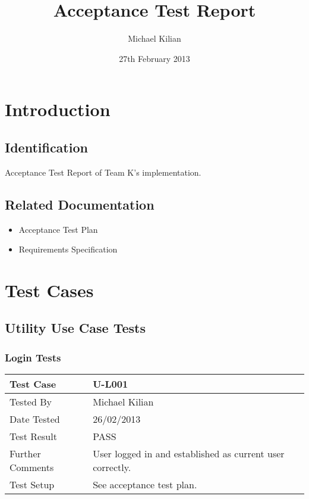 \documentclass{l3deliverable}
\title{Acceptance Test Report}
\author{
  Michael Kilian \\
}
\date{27th February 2013}
\begin{document}

\maketitle

\tableofcontents

\newpage


\section{Introduction}

\subsection{Identification}
Acceptance Test Report of Team K's implementation.

\subsection{Related Documentation}
\begin{itemize}
\item{Acceptance Test Plan}
\item{Requirements Specification}
\end{itemize}


\section{Test Cases}


\subsection{Utility Use Case Tests}

\subsubsection{Login Tests}
\begin{tabular}{lp{10cm}}
\hline 
\textbf{Test Case} & U-L001\tabularnewline
\hline 
\hline 
Tested By & Michael Kilian\tabularnewline
\hline 
Date Tested & 26/02/2013\tabularnewline
\hline 
Test Result & PASS\tabularnewline
\hline
Further Comments & User logged in and established as current user correctly. \tabularnewline
\hline
Test Setup & See acceptance test plan. \tabularnewline
\hline
\end{tabular}\\
\end{document}
